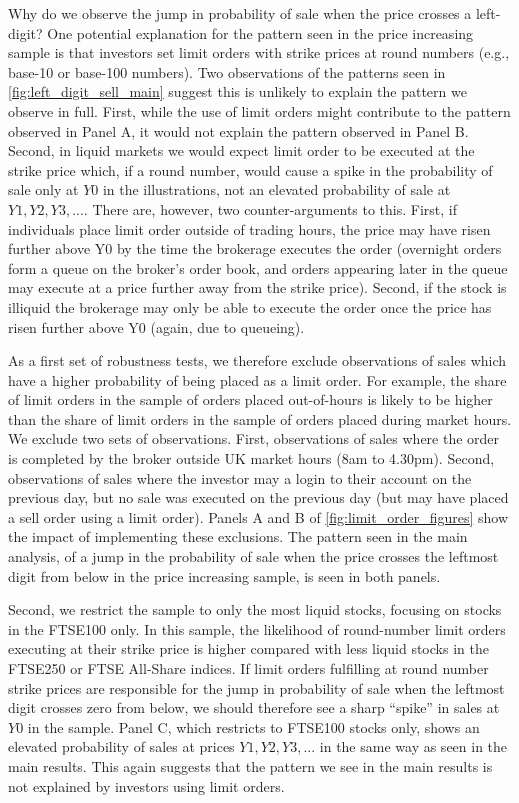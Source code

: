 Why do we observe the jump in probability of sale when the price crosses a left-digit? One potential explanation for the pattern seen in the price increasing sample is that investors set limit orders with strike prices at round numbers (e.g., base-10 or base-100 numbers). Two observations of the patterns seen in \ref{fig:left_digit_sell_main} suggest this is unlikely to explain the pattern we observe in full. First, while the use of limit orders might contribute to the pattern observed in Panel A, it would not explain the pattern observed in Panel B. Second, in liquid markets we would expect limit order to be executed at the strike price which, if a round number, would cause a spike in the probability of sale only at $Y0$ in the illustrations, not an elevated probability of sale at $Y1, Y2, Y3, ...$. There are, however, two counter-arguments to this. First, if individuals place limit order outside of trading hours, the price may have risen further above Y0 by the time the brokerage executes the order (overnight orders form a queue on the broker's order book, and orders appearing later in the queue may execute at a price further away from the strike price). Second, if the stock is illiquid the brokerage may only be able to execute the order once the price has risen further above Y0 (again, due to queueing). 

As a first set of robustness tests, we therefore exclude observations of sales which have a higher probability of being placed as a limit order. For example, the share of limit orders in the sample of orders placed out-of-hours is likely to be higher than the share of limit orders in the sample of orders placed during market hours. We exclude two sets of observations. First, observations of sales where the order is completed by the broker outside UK market hours (8am to 4.30pm). Second, observations of sales where the investor may a login to their account on the previous day, but no sale was executed on the previous day (but may have placed a sell order using a limit order). Panels A and B of \ref{fig:limit_order_figures} show the impact of implementing these exclusions. The pattern seen in the main analysis, of a jump in the probability of sale when the price crosses the leftmost digit from below in the price increasing sample, is seen in both panels.

Second, we restrict the sample to only the most liquid stocks, focusing on stocks in the FTSE100 only. In this sample, the likelihood of round-number limit orders executing at their strike price is higher compared with less liquid stocks in the FTSE250 or FTSE All-Share indices. If limit orders fulfilling at round number strike prices are responsible for the jump in probability of sale when the leftmost digit crosses zero from below, we should therefore see a sharp ``spike'' in sales at $Y0$ in the sample. Panel C, which restricts to FTSE100 stocks only, shows an elevated probability of sales at prices $Y1, Y2, Y3, ...$ in the same way as seen in the main results. This again suggests that the pattern we see in the main results is not explained by investors using limit orders.

